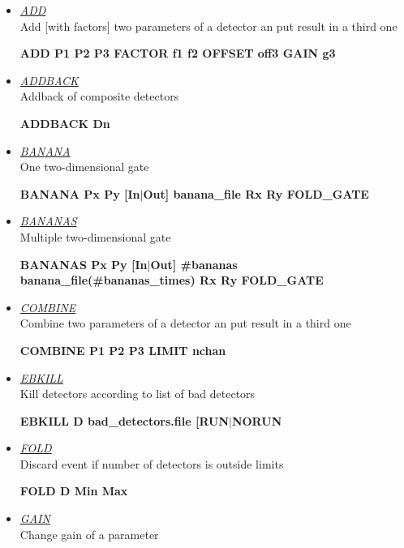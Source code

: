 \begin{itemize}

 \item	{\it\underline{ADD}} \\
	{\sc Add [with factors] two parameters of a detector an put result in a third one}

	\smallskip
	{\bf ADD P1 P2 P3 FACTOR f1 f2 OFFSET off3 GAIN g3} \\

 \item	{\it\underline{ADDBACK}} \\
	{\sc Addback of composite detectors} 

	\smallskip
	{\bf ADDBACK Dn} \\

 \item	{\it\underline{BANANA}} \\
	{\sc One two-dimensional gate}

	\smallskip
	{\bf BANANA Px Py [In$|$Out] banana\_file Rx Ry FOLD\_GATE} \\

 \item	{\it\underline{BANANAS}} \\
	{\sc Multiple two-dimensional gate}

	\smallskip
	{\bf BANANAS Px Py [In$|$Out] \#bananas banana\_file(\#bananas\_times) 
	Rx Ry FOLD\_GATE} \\

 \item	{\it\underline{COMBINE}} \\
	{\sc Combine two parameters of a detector an put result in a third one}

	\smallskip
	{\bf COMBINE P1 P2 P3 LIMIT nchan} \\

 \item 	{\it\underline{EBKILL}} \\
	{\sc Kill detectors according to list of bad detectors}

	\smallskip
	{\bf EBKILL  D  bad\_detectors.file [RUN$|$NORUN} \\

 \item 	{\it\underline{FOLD}} \\
	{\sc Discard event if number of detectors is outside limits}

	\smallskip
	{\bf FOLD  D  Min Max} \\

 \item	{\it\underline{GAIN}} \\
	{\sc Change gain of a parameter}


\end{itemize}
